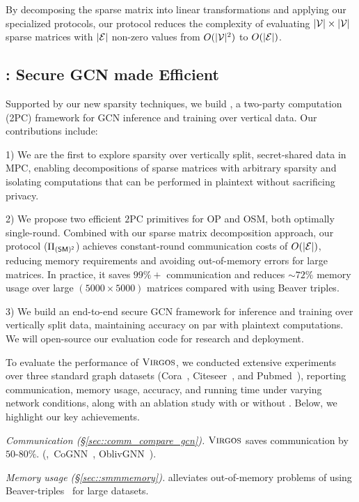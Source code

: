 By decomposing the sparse matrix into linear transformations and applying our specialized protocols, our \osmm protocol
reduces the complexity of evaluating $|\mathcal{V}| \times |\mathcal{V}|$ sparse matrices with $|\mathcal{E}|$ non-zero values from $O(|\mathcal{V}|^2)$ to $O(|\mathcal{E}|)$.

\subsection{\cgnn: Secure GCN made Efficient}
Supported by our new sparsity techniques, we build \cgnn, 
a two-party computation (2PC) framework for GCN inference and training over vertical
data.
Our contributions include:

1) We are the first to explore sparsity over vertically split, secret-shared data in MPC, enabling decompositions of sparse matrices with arbitrary sparsity and isolating computations that can be performed in plaintext without sacrificing privacy.

2) We propose two efficient $2$PC primitives for OP and OSM, both optimally single-round.
Combined with our sparse matrix decomposition approach, our \osmm protocol ($\Pi_{\mathsf{(SM)^2}}$) achieves constant-round communication costs of $O(|\mathcal{E}|)$, reducing memory requirements and avoiding out-of-memory errors for large matrices.
In practice, it saves $99\%+$ communication
and reduces ${\sim}72\%$ memory usage over large $(5000\times5000)$ matrices compared with using Beaver triples.

3) We build an end-to-end secure GCN framework for inference and training over vertically split data, maintaining accuracy on par with plaintext computations.
We will open-source our evaluation code for research and deployment.

To evaluate the performance of $\textnormal{\textsc{Virgos}}$, we conducted extensive experiments over three standard graph datasets (Cora~\cite{aim/SenNBGGE08}, Citeseer~\cite{dl/GilesBL98}, and Pubmed~\cite{ijcnlp/DernoncourtL17}),
reporting communication, memory usage, accuracy, and running time under varying network conditions, along with an ablation study with or without \osmm.
Below, we highlight our key achievements.

\textit{Communication (\S\ref{sec::comm_compare_gcn}).}
$\textnormal{\textsc{Virgos}}$ saves communication by $50$-$80\%$.
(\cf,~CoGNN~\cite{ccs/KotiKPG24}, OblivGNN~\cite{uss/XuL0AYY24}).

\textit{Memory usage (\S\ref{sec::smmmemory}).}
\cgnn alleviates out-of-memory problems of using %
Beaver-triples~\cite{crypto/Beaver91a} for large datasets.

